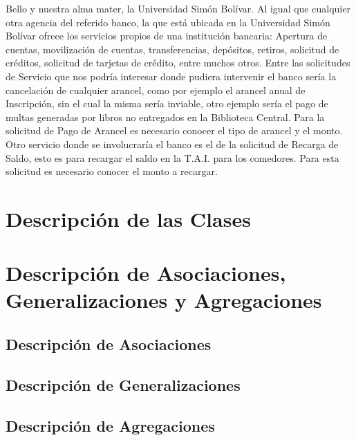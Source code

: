 \message{ !name(InformeFase2.tex)}\documentclass[12pt,a4paper,spanish]{article}
\begin{document}
Bello y nuestra alma mater, la Universidad Sim\'on Bol\'ivar. 
\newline
\newline
\indent Al igual que cualquier otra agencia del referido banco, la que est\'a ubicada en la Universidad Sim\'on Bol\'ivar ofrece los servicios propios de una instituci\'on bancaria: Apertura de cuentas, movilizaci\'on de cuentas, transferencias, dep\'ositos, retiros, solicitud de cr\'editos, solicitud de tarjetas de cr\'edito, entre muchos otros. 
\newline
\newline
\indent Entre las solicitudes de Servicio que nos podr\'ia interesar
donde pudiera intervenir el banco ser\'ia la cancelaci\'on de
cualquier arancel, como por ejemplo el arancel anual de Inscripci\'on,
sin el cual la misma ser\'ia inviable, otro ejemplo ser\'ia el pago de
multas generadas por libros no entregados en la Biblioteca
Central. Para la solicitud de Pago de Arancel es necesario conocer el
tipo de arancel y el monto. Otro servicio donde se involucrar\'ia el
banco es el de la solicitud de Recarga de Saldo, esto es para recargar
el saldo en la T.A.I. para los comedores. Para esta solicitud es
necesario conocer el monto a recargar.


\newpage

\section{Descripci\'on de las Clases}
\begin{landscape}

\end{landscape}
 
\newpage

\section{Descripci\'on de Asociaciones, Generalizaciones y Agregaciones}

\subsection{Descripci\'on de Asociaciones}

\subsection{Descripci\'on de Generalizaciones}

\subsection{Descripci\'on de Agregaciones}
\end{document}
